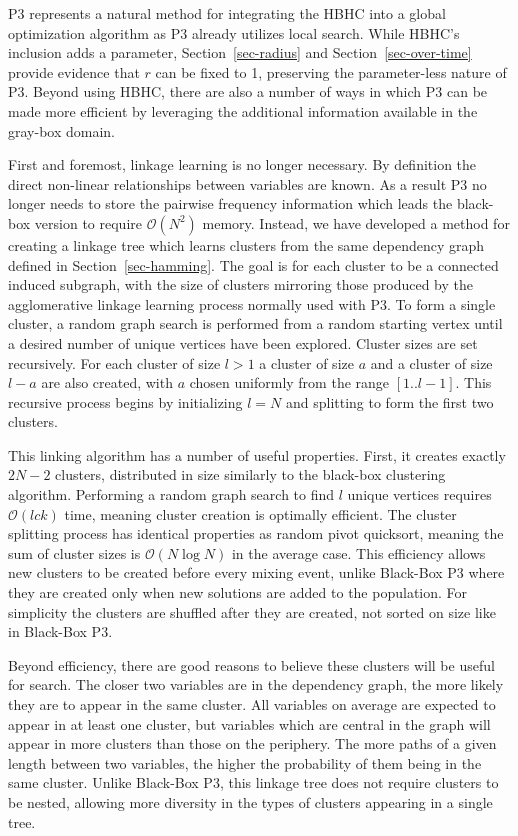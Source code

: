 \documentclass{sig-alternate}
\newcommand{\BigO}[1]{$\mathcal{O}{(#1)}$}
\begin{document}
P3 represents a natural method for integrating the HBHC into
a global optimization algorithm as P3 already utilizes local search.
While HBHC's inclusion adds a parameter, Section~\ref{sec-radius} and
Section~\ref{sec-over-time} provide evidence that $r$ can be fixed to 1, preserving
the parameter-less nature of P3.
Beyond using HBHC, there
are also a number of ways in which P3 can be made more efficient by leveraging the
additional information available in the gray-box domain.

First and foremost, linkage learning is no longer necessary. By definition
the direct non-linear relationships between variables are known. As a result
P3 no longer needs to store the pairwise frequency information which leads
the black-box version to require \BigO{N^2} memory. Instead,
we have developed a method for creating a linkage tree which learns clusters
from the same dependency graph defined in Section~\ref{sec-hamming}. The goal is for each
cluster to be a connected induced subgraph, with the size of clusters
mirroring those produced by the agglomerative linkage learning process normally
used with P3. To form a single cluster, a random graph search is performed from
a random starting vertex until a desired number of unique vertices have been explored.
Cluster sizes are set recursively. For each cluster of size $l>1$
a cluster of size $a$ and a cluster of size $l-a$ are also created, with $a$ chosen uniformly
from the range $[1..l-1]$. This recursive process begins by initializing $l=N$ and splitting
to form the first two clusters.

This linking algorithm has a number of useful properties. First, it creates exactly
$2N-2$ clusters, distributed in size similarly to the black-box clustering algorithm.
Performing a random graph search to find $l$ unique vertices requires \BigO{lck} time,
meaning cluster creation is optimally efficient.
The cluster splitting process has identical properties as random pivot quicksort,
meaning the sum of cluster sizes is \BigO{N\log N} in the average case.
This efficiency allows new clusters to be created before every mixing event,
unlike Black-Box P3 where they are created only when new solutions are added to the population.
For simplicity the clusters are shuffled after they are created, not sorted on size like in
Black-Box P3.

Beyond efficiency, there are good reasons to believe these clusters will be useful
for search. The closer two variables are in the dependency graph, the more likely
they are to appear in the same cluster. All variables on average are expected to appear
in at least one cluster, but variables which are central in the graph will appear in more
clusters than those on the periphery. The more paths of a given
length between two variables, the higher the probability of them being in the same cluster.
Unlike Black-Box P3, this linkage tree does not require clusters to be nested, allowing
more diversity in the types of clusters appearing in a single tree.
\end{document}

